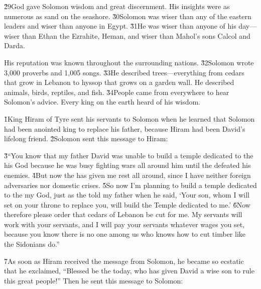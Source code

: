\v{29}God gave Solomon wisdom and great discernment. His insights were as numerous as sand on the seashore. \v{30}Solomon was wiser than any of the eastern leaders and wiser than anyone in Egypt. \v{31}He was wiser than anyone of his day---wiser than Ethan the Ezrahite, Heman, and wiser than Mahol's sons Calcol and Darda.

His reputation was known throughout the surrounding nations. \v{32}Solomon wrote 3,000 proverbs and 1,005 songs. \v{33}He described trees---everything from cedars that grow in Lebanon to hyssop that grows on a garden wall. He described animals, birds, reptiles, and fish. \v{34}People came from everywhere to hear Solomon's advice. Every king on the earth heard of his wisdom.

\v{1}King Hiram of Tyre sent his servants to Solomon when he learned that Solomon had been anointed king to replace his father, because Hiram had been David's lifelong friend. \v{2}Solomon sent this message to Hiram:

\begin{poetry}
\poeml \v{3}``You know that my father David was unable to build a temple dedicated to the  his God because he was busy fighting wars all around him until the  defeated his enemies. \v{4}But now the  has given me rest all around, since I have neither foreign adversaries nor domestic crises. \v{5}So now I'm planning to build a temple dedicated to the  my God, just as the  told my father when he said, `Your son, whom I will set on your throne to replace you, will build the Temple dedicated to me.' \v{6}Now therefore please order that cedars of Lebanon be cut for me. My servants will work with your servants, and I will pay your servants whatever wages you set, because you know there is no one among us who knows how to cut timber like the Sidonians do.''
\end{poetry}

\v{7}As soon as Hiram received the message from Solomon, he became so ecstatic that he exclaimed, ``Blessed be the  today, who has given David a wise son to rule this great people!'' Then he sent this message to Solomon:

